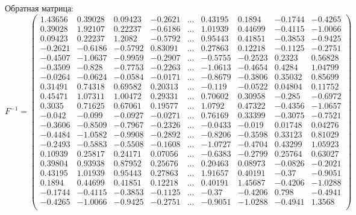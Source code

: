 \documentclass[12pt]{article}
\begin{document}
\indent Обратная матрица:
\begin{equation*}
   F^{-1} =  \left(
    \begin{array}{cccccccccccccccccccc}
1.43656 & 0.39028 & 0.09423 & -0.2621 & \ldots & 0.43195 & 0.1894 & -0.1744 & -0.4265 \\
0.39028 & 1.92107 & 0.22237 & -0.6186 & \ldots & 1.01939 & 0.44699 & -0.4115 & -1.0066 \\
0.09423 & 0.22237 & 1.2082 & -0.5792 & \ldots & 0.95443 & 0.41851 & -0.3853 & -0.9425 \\
-0.2621 & -0.6186 & -0.5792 & 0.83091 & \ldots & 0.27863 & 0.12218 & -0.1125 & -0.2751 \\
-0.4507 & -1.0637 & -0.9959 & -0.2907 & \ldots & -0.5755 & -0.2523 & 0.2323 & 0.56828 \\
-0.3509 & -0.828 & -0.7753 & -0.2263 & \ldots & -1.0613 & -0.4654 & 0.4284 & 1.04799 \\
-0.0264 & -0.0624 & -0.0584 & -0.0171 & \ldots & -0.8679 & -0.3806 & 0.35032 & 0.85699 \\
0.31491 & 0.74318 & 0.69582 & 0.20313 & \ldots & -0.119 & -0.0522 & 0.04804 & 0.11752 \\
0.45471 & 1.07311 & 1.00472 & 0.29331 & \ldots & 0.70602 & 0.30958 & -0.285 & -0.6972 \\
0.3035 & 0.71625 & 0.67061 & 0.19577 & \ldots & 1.0792 & 0.47322 & -0.4356 & -1.0657 \\
-0.042 & -0.099 & -0.0927 & -0.0271 & \ldots & 0.76169 & 0.33399 & -0.3075 & -0.7521 \\
-0.3606 & -0.8509 & -0.7967 & -0.2326 & \ldots & -0.0433 & -0.019 & 0.01748 & 0.04276 \\
-0.4484 & -1.0582 & -0.9908 & -0.2892 & \ldots & -0.8206 & -0.3598 & 0.33123 & 0.81029 \\
-0.2493 & -0.5883 & -0.5508 & -0.1608 & \ldots & -1.0727 & -0.4704 & 0.43299 & 1.05923 \\
0.10939 & 0.25817 & 0.24171 & 0.07056 & \ldots & -0.6383 & -0.2799 & 0.25764 & 0.63027 \\
0.39804 & 0.93938 & 0.87952 & 0.25676 & \ldots & 0.20463 & 0.08973 & -0.0826 & -0.2021 \\
0.43195 & 1.01939 & 0.95443 & 0.27863 & \ldots & 1.91657 & 0.40191 & -0.37 & -0.9051 \\
0.1894 & 0.44699 & 0.41851 & 0.12218 & \ldots & 0.40191 & 1.45687 & -0.4206 & -1.0288 \\
-0.1744 & -0.4115 & -0.3853 & -0.1125 & \ldots & -0.37 & -0.4206 & 0.798 & -0.4941 \\
-0.4265 & -1.0066 & -0.9425 & -0.2751 & \ldots & -0.9051 & -1.0288 & -0.4941 & 1.3568 \\


    \end{array}
    \right)
\end{equation*}
\end{document}
